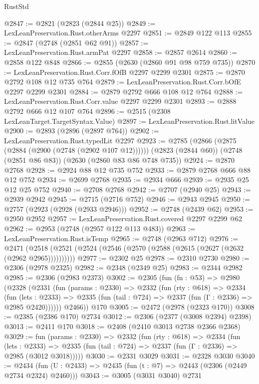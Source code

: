 \begin{lexlean}{RustStd}
\begin{coremodule}
@2847 := @2821 (@2823 (@2844 @25))
@2849 := LexLeanPreservation.Rust.otherArms @2297
@2851 := @2849 @122 @113
@2855 := @2847 (@2748 (@2851 @62 @91))
@2857 := LexLeanPreservation.Rust.armPat @2297
@2858 := @2857 @2614
@2860 := @2858 @122 @848
@2866 := @2855 (@2630 (@2860 @91 @98 @759 @735))
@2870 := LexLeanPreservation.Rust.Corr.fOfB @2297 @2299 @2301
@2875 := @2870 @2792 @108 @12 @735 @764
@2879 := LexLeanPreservation.Rust.Corr.bOfE @2297 @2299 @2301
@2884 := @2879 @2792 @666 @108 @12 @764
@2888 := LexLeanPreservation.Rust.Corr.value @2297 @2299 @2301
@2893 := @2888 @2792 @666 @12 @107 @764
@2896 := @2515 (@2308 LexLeanTarget.TargetSyntax.Value)
@2897 := LexLeanPreservation.Rust.litValue
@2900 := @2893 (@2896 (@2897 @764))
@2902 := LexLeanPreservation.Rust.typedLit @2297
@2923 := @2785
    (@2866 (@2875 (@2884 (@2900 (@2748 (@2902 @107 @12))))))
    (@2823 (@2844 @60))
    (@2748 (@2851 @86 @83))
    (@2630 (@2860 @83 @86 @748 @735))
@2924 := @2870 @2768
@2928 := @2924 @88 @12 @735 @752
@2933 := @2879 @2768 @666 @88 @12 @752
@2934 := @2699 @2768
@2935 := @2934 @666
@2939 := @2935 @25 @12 @25 @752
@2940 := @2708 @2768
@2942 := @2707 (@2940 @25)
@2943 := @2939 @2942
@2945 := @2715 (@2716 @752)
@2946 := @2943 @2945
@2950 := @2757 (@2923 (@2928 (@2933 @2946)))
@2952 := @2748 (@2439 @62)
@2953 := @2950 @2952
@2957 := LexLeanPreservation.Rust.covered @2297 @2299 @62
@2962 := @2953 (@2748 (@2957 @122 @113 @483))
@2963 := LexLeanPreservation.Rust.isTemp
@2965 := @2748 (@2963 @712)
@2976 := @2471 (@2518 (@2521 (@2524 (@2546 (@2570 (@2588 (@2615 (@2627 (@2632 (@2962 @2965))))))))))
@2977 := @2302 @25
@2978 := @2310 @2730
@2980 := @2306 (@2978 @2325)
@2982 := @2348 (@2349 @25)
@2983 := @2344 @2982
@2985 := @2306 (@2983 @2373)
@3002 := @2305
    (fun (fn : @53) =>
    @2980
      (@2328
        (@2331
          (fun (params : @2330) =>
          @2332
            (fun (rty : @618) =>
            @2334
              (fun (lets : @2333) =>
              @2335 (fun (tail : @724) => @2337 (fun (Γ : @2336) => @2985 @2420))))))
        @2466))
    @170
@3005 := @2472 (@2978 (@2323 @170))
@3008 := @2385 (@2386 @170) @2734
@3012 := @2306 (@2377 (@3008 @2394) @2398)
@3013 := @2411 @170
@3018 := @2408 (@2410 @3013 @2738 @2366 @2368)
@3029 := fun (params : @2330) =>
  @2332
    (fun (rty : @618) =>
    @2334
      (fun (lets : @2333) =>
      @2335 (fun (tail : @724) => @2337 (fun (Γ : @2336) => @2985 (@3012 @3018)))))
@3030 := @2331 @3029
@3031 := @2328 @3030
@3040 := @2434 (fun (U : @2433) => @2435 (fun (t : @7) => @2443 (@2306 (@2449 @2734 @2324) @2460)))
@3043 := @3005 (@3031 @3040) @2731

\end{coremodule}
\end{lexlean}
